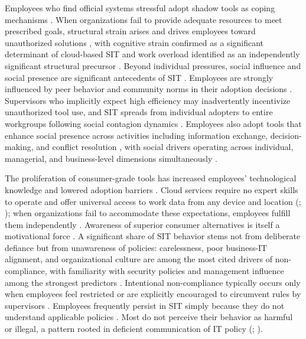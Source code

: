 \documentclass[12pt,oneside]{article}
\begin{document}
Employees who find official systems stressful adopt shadow tools as coping mechanisms \citep[115]{white2023workarounds}. When organizations fail to provide adequate resources to meet prescribed goals, structural strain arises and drives employees toward unauthorized solutions \citep[5]{thatte2012feral}, with cognitive strain confirmed as a significant determinant of cloud-based \ac{SIT} and work overload identified as an independently significant structural precursor \citep[74, 76]{ogedengbe2024influence}. Beyond individual pressures, social influence and social presence are significant antecedents of \ac{SIT} \citep[6467]{mallmann2019social}. Employees are strongly influenced by peer behavior and community norms in their adoption decisions \citep[12]{mallmann2018weare}. Supervisors who implicitly expect high efficiency may inadvertently incentivize unauthorized tool use, and \ac{SIT} spreads from individual adopters to entire workgroups following social contagion dynamics \citep[13, 14]{mallmann2018weare}. Employees also adopt tools that enhance social presence across activities including information exchange, decision-making, and conflict resolution \citep[428]{mallmann2021mediating}, with social drivers operating across individual, managerial, and business-level dimensions simultaneously \citep[4]{godefroid2021it}.

The proliferation of consumer-grade tools has increased employees' technological knowledge and lowered adoption barriers \citep[8]{thatte2012feral}. Cloud services require no expert skills to operate and offer universal access to work data from any device and location (\citealp[436]{mallmann2021mediating}; \citealp[644]{walterbusch2017missing}); when organizations fail to accommodate these expectations, employees fulfill them independently \citep[653]{walterbusch2017missing}. Awareness of superior consumer alternatives is itself a motivational force \citep[321]{junglas2019innovation}. A significant share of \ac{SIT} behavior stems not from deliberate defiance but from unawareness of policies: carelessness, poor business-\ac{IT} alignment, and organizational culture are among the most cited drivers of non-compliance, with familiarity with security policies and management influence among the strongest predictors \citep[2, 10]{silvius2012factors}. Intentional non-compliance typically occurs only when employees feel restricted or are explicitly encouraged to circumvent rules by supervisors \citep[12]{silvius2012factors}. Employees frequently persist in \ac{SIT} simply because they do not understand applicable policies \citep[277-278]{silic2014shadow}. Most do not perceive their behavior as harmful or illegal, a pattern rooted in deficient communication of \ac{IT} policy (\citealp[279]{silic2014shadow}; \citealp[14-15]{mallmann2018weare}).
\end{document}
